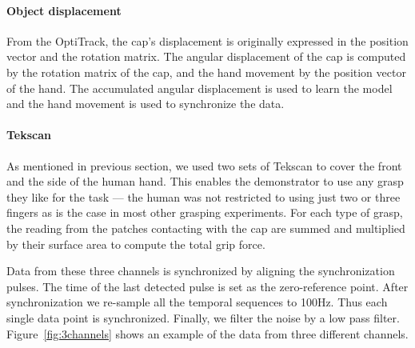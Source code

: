 \paragraph{\textbf{Object displacement}}
\label{sec:optiktrack}
From the OptiTrack, the cap's displacement is originally expressed in
the position vector and the rotation matrix. The angular
displacement of the cap is computed by the rotation matrix of the cap, and
the hand movement by the position vector of the hand. The accumulated
angular displacement is used to learn the model and the hand movement
is used to synchronize the data.



\paragraph{Tekscan}

As mentioned in previous section, we used two sets of Tekscan to cover
the front and the side of the human hand. This enables the
demonstrator to use any grasp they like for the task --- the human was
not restricted to using just two or three fingers as is the case in
most other grasping experiments. For each type of grasp, the reading
from the patches contacting with the cap are summed and multiplied by
their surface area to compute the total grip force.

Data from these three channels is synchronized by aligning the
synchronization pulses. The time of the last detected pulse is set as
the zero-reference point. After synchronization we re-sample all the
temporal sequences to 100Hz. Thus each single data point is
synchronized. Finally, we filter the noise by a low pass
filter. Figure~\ref{fig:3channels} shows an example of the data from
three different channels.




